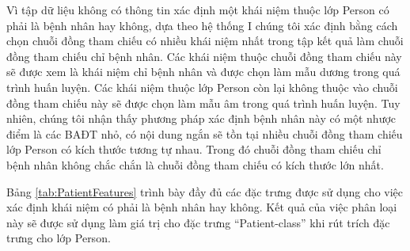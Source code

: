 Vì tập dữ liệu không có thông tin xác định một khái niệm thuộc lớp Person có phải là bệnh nhân hay không, dựa theo hệ thống I chúng tôi xác định bằng cách chọn chuỗi đồng tham chiếu có nhiều khái niệm nhất trong tập kết quả làm chuỗi đồng tham chiếu chỉ bệnh nhân. Các khái niệm thuộc chuỗi đồng tham chiếu này sẽ được xem là khái niệm chỉ bệnh nhân và được chọn làm mẫu dương trong quá trình huấn luyện. Các khái niệm thuộc lớp Person còn lại không thuộc vào chuỗi đồng tham chiếu này sẽ được chọn làm mẫu âm trong quá trình huấn luyện. Tuy nhiên, chúng tôi nhận thấy phương pháp xác định bệnh nhân này có một nhược điểm là các BAĐT nhỏ, có nội dung ngắn sẽ tồn tại nhiều chuỗi đồng tham chiếu lớp Person có kích thước tương tự nhau. Trong đó chuỗi đồng tham chiếu chỉ bệnh nhân không chắc chắn là chuỗi đồng tham chiếu có kích thước lớn nhất.

Bảng \ref{tab:PatientFeatures} trình bày đầy đủ các đặc trưng được sử dụng cho việc xác định khái niệm có phải là bệnh nhân hay không. Kết quả của việc phân loại này sẽ được sử dụng làm giá trị cho đặc trưng ``Patient-class'' khi rút trích đặc trưng cho lớp Person.

